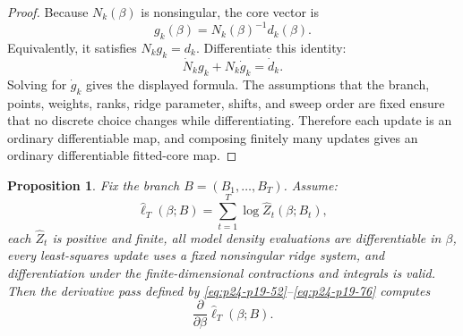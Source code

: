 \documentclass[11pt]{article}
\newtheorem{proposition}{Proposition}
\newcommand{\widehatell}{\widehat\ell}
\begin{document}
\begin{proof}
Because \(N_k(\beta)\) is nonsingular, the core vector is
\[
    g_k(\beta)=N_k(\beta)^{-1}d_k(\beta).
\]
Equivalently, it satisfies \(N_k g_k=d_k\).  Differentiate this identity:
\[
    \dot N_k g_k+N_k\dot g_k=\dot d_k.
\]
Solving for \(\dot g_k\) gives the displayed formula.  The assumptions that the
branch, points, weights, ranks, ridge parameter, shifts, and sweep order are
fixed ensure that no discrete choice changes while differentiating.  Therefore
each update is an ordinary differentiable map, and composing finitely many
updates gives an ordinary differentiable fitted-core map.
\end{proof}

\begin{proposition}
Fix the branch \(B=(B_1,\ldots,B_T)\).  Assume:
\[
    \widehatell_T(\beta;B)=\sum_{t=1}^T\log\widehat Z_t(\beta;B_t),
    \label{eq:p24-p19-85}
\]
each \(\widehat Z_t\) is positive and finite, all model density evaluations are
differentiable in \(\beta\), every least-squares update uses a fixed
nonsingular ridge system, and differentiation under the finite-dimensional
contractions and integrals is valid.  Then the derivative pass defined by
\eqref{eq:p24-p19-52}--\eqref{eq:p24-p19-76} computes
\[
    \frac{\partial}{\partial\beta}
    \widehatell_T(\beta;B).
    \label{eq:p24-p19-86}
\]
\end{proposition}
\end{document}
